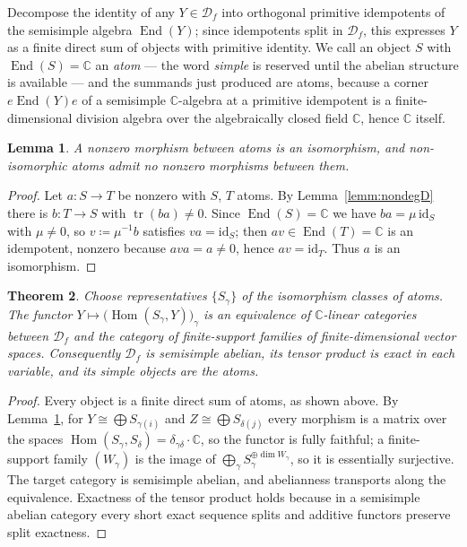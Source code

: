 \documentclass[11pt]{article}
\newtheorem{theo}{Theorem}[section]
\newtheorem{lemm}[theo]{Lemma}
\newcommand{\cauchy}{\mathcal{D}_{f}}             %
\newcommand{\End}{\operatorname{End}}
\newcommand{\Hom}{\operatorname{Hom}}
\newcommand{\tr}{\operatorname{tr}}
\begin{document}
Decompose the identity of any $Y\in\cauchy$ into orthogonal
primitive idempotents of the semisimple algebra $\End(Y)$; since
idempotents split in $\cauchy$, this expresses $Y$ as a finite
direct sum of objects with primitive identity. We call an object
$S$ with $\End(S)=\mathbb{C}$ an \emph{atom} --- the word
\emph{simple} is reserved until the abelian structure is
available --- and the summands just
produced are atoms, because a corner $e\End(Y)e$ of a semisimple
$\mathbb{C}$-algebra at a primitive idempotent is a
finite-dimensional division algebra over the algebraically closed
field $\mathbb{C}$, hence $\mathbb{C}$ itself.

\begin{lemm}\label{lemm:dichotomy}
A nonzero morphism between atoms is an isomorphism, and
non-isomorphic atoms admit no nonzero morphisms between them.
\end{lemm}

\begin{proof}
Let $a\colon S\to T$ be nonzero with $S$, $T$ atoms. By
Lemma~\ref{lemm:nondegD} there is $b\colon T\to S$ with
$\tr(ba)\ne0$. Since $\End(S)=\mathbb{C}$ we have
$ba=\mu\,\mathrm{id}_{S}$ with $\mu\ne0$, so
$v\coloneqq\mu^{-1}b$ satisfies $va=\mathrm{id}_{S}$; then
$av\in\End(T)=\mathbb{C}$ is an idempotent, nonzero because
$ava=a\ne0$, hence $av=\mathrm{id}_{T}$. Thus $a$ is an
isomorphism.
\end{proof}

\begin{theo}\label{theo:semisimple}
Choose representatives $\{S_{\gamma}\}$ of the isomorphism classes
of atoms. The functor
$Y\mapsto\bigl(\Hom(S_{\gamma},Y)\bigr)_{\gamma}$ is an
equivalence of $\mathbb{C}$-linear categories between $\cauchy$
and the category of finite-support families of finite-dimensional
vector spaces. Consequently $\cauchy$ is semisimple abelian, its
tensor product is exact in each variable, and its simple objects
are the atoms.
\end{theo}

\begin{proof}
Every object is a finite direct sum of atoms, as shown above. By
Lemma~\ref{lemm:dichotomy}, for $Y\cong\bigoplus S_{\gamma(i)}$
and $Z\cong\bigoplus S_{\delta(j)}$ every morphism is a matrix
over the spaces
$\Hom(S_{\gamma},S_{\delta})=\delta_{\gamma\delta}\cdot\mathbb{C}$,
so the functor is fully faithful; a finite-support family
$(W_{\gamma})$ is the image of
$\bigoplus_{\gamma}S_{\gamma}^{\oplus\dim W_{\gamma}}$, so it is
essentially surjective. The target category is semisimple abelian,
and abelianness transports along the equivalence. Exactness of the
tensor product holds because in a semisimple abelian category
every short exact sequence splits and additive functors preserve
split exactness.
\end{proof}
\end{document}

